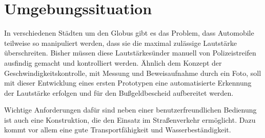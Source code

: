 \section{Umgebungssituation}

In verschiedenen Städten um den Globus gibt es das Problem, dass Automobile teilweise so manipuliert werden, dass sie die maximal zulässige Lautstärke überschreiten. Bisher müssen diese Lautstärkesünder manuell von Polizeistreifen ausfindig gemacht und kontrolliert werden. Ähnlich dem Konzept der Geschwindigkeitskontrolle, mit Messung und Beweisaufnahme durch ein Foto, soll mit dieser Entwicklung eines ersten Prototypen eine automatisierte Erkennung der Lautstärke erfolgen und für den Bußgeldbescheid aufbereitet werden.

Wichtige Anforderungen dafür sind neben einer benutzerfreundlichen Bedienung ist auch eine Konstruktion, die den Einsatz im Straßenverkehr ermöglicht. Dazu kommt vor allem eine gute Transportfähigkeit und Wasserbeständigkeit.

\newpage